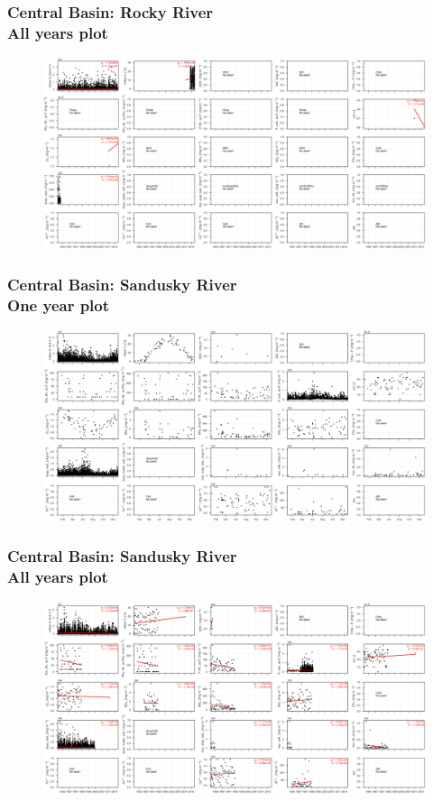 \documentclass{beamer}
\begin{document}
\begin{frame}
\frametitle{Central Basin: Rocky River\\ All years plot}
\begin{figure}
\includegraphics[width=\textwidth]{rivers/Central basin/plot_all rockyriver.png}
\end{figure}
\end{frame}

\begin{frame}
\frametitle{Central Basin: Sandusky River\\ One year plot}
\begin{figure}
\includegraphics[width=\textwidth]{rivers/Central basin/plot_1yr sanduskyriver.png}
\end{figure}
\end{frame}

\begin{frame}
\frametitle{Central Basin: Sandusky River\\ All years plot}
\begin{figure}
\includegraphics[width=\textwidth]{rivers/Central basin/plot_all sanduskyriver.png}
\end{figure}
\end{frame}
\end{document}
